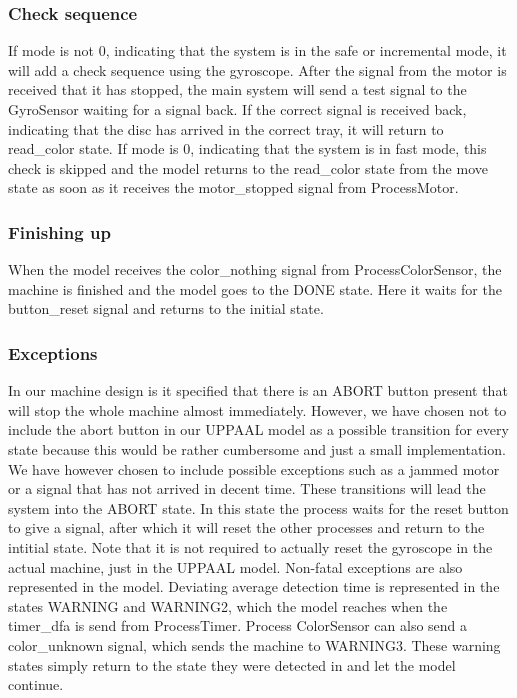 \documentclass[a4paper,oneside,11pt]{article}
\begin{document}
\subsubsection{Check sequence}
If mode is not 0, indicating that the system is in the safe or incremental mode, it will add a check sequence using the gyroscope. After the signal from the motor is received that it has stopped, the main system will send a test signal to the GyroSensor waiting for a signal back. If the correct signal is received back, indicating that the disc has arrived in the correct tray, it will return to read\_color state. If mode is 0, indicating that the system is in fast mode, this check is skipped and the model returns to the read\_color state from the move state as soon as it receives the motor\_stopped signal from ProcessMotor.

\subsubsection{Finishing up}
When the model receives the color\_nothing signal from ProcessColorSensor, the machine is finished and the model goes to the DONE state. Here it waits for the button\_reset signal and returns to the initial state.

\subsubsection{Exceptions}
In our machine design is it specified that there is an ABORT button present that will stop the whole machine almost immediately. However, we have chosen not to include the abort button in our UPPAAL model as a possible transition for every state because this would be rather cumbersome and just a small implementation. We have however chosen to include possible exceptions such as a jammed motor or a signal that has not arrived in decent time. These transitions will lead the system into the ABORT state. In this state the process waits for the reset button to give a signal, after which it will reset the other processes and return to the intitial state. Note that it is not required to actually reset the gyroscope in the actual machine, just in the UPPAAL model. Non-fatal exceptions are also represented in the model. Deviating average detection time is represented in the states WARNING and WARNING2, which the model reaches when the timer\_dfa is send from ProcessTimer. Process ColorSensor can also send a color\_unknown signal, which sends the machine to WARNING3. These warning states simply return to the state they were detected in and let the model continue.
\end{document}
